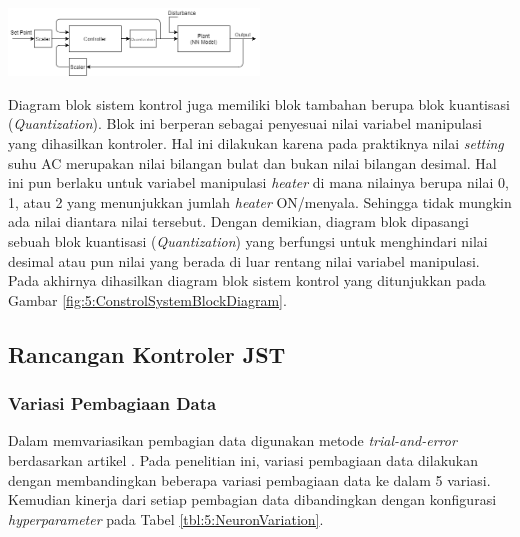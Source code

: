 \documentclass[a4paper,10pt]{article}
\makeatletter
\newenvironment{body}{\begin{multicols}{2}}{\end{multicols}}
\renewenvironment{figure}
{\def\@captype{figure}%
	\captionsetup{labelsep=period,format=hang,font=footnotesize,justification=justified}
}
{}
\makeatother
\begin{document}
\begin{body}
		\begin{figure}
			\centering
			\includegraphics[width=0.5\textwidth]{figures/ControlDesignDiagramII}
			\caption{Diagram blok sistem kontrol berbasis JST}
			\label{fig:5:ConstrolSystemBlockDiagram}
		\end{figure}
		
		Diagram blok sistem kontrol juga memiliki blok tambahan berupa blok kuantisasi (\textit{Quantization}). Blok ini berperan sebagai penyesuai nilai variabel manipulasi yang dihasilkan kontroler. Hal ini dilakukan karena pada praktiknya nilai \textit{setting} suhu AC merupakan nilai bilangan bulat dan bukan nilai bilangan desimal. Hal ini pun berlaku untuk variabel manipulasi \textit{heater} di mana nilainya berupa nilai 0, 1, atau 2 yang menunjukkan jumlah \textit{heater} ON/menyala. Sehingga tidak mungkin ada nilai diantara nilai tersebut. Dengan demikian, diagram blok dipasangi sebuah blok kuantisasi (\textit{Quantization}) yang berfungsi untuk menghindari nilai desimal atau pun nilai yang berada di luar rentang nilai variabel manipulasi. Pada akhirnya dihasilkan diagram blok sistem kontrol yang ditunjukkan pada Gambar \ref{fig:5:ConstrolSystemBlockDiagram}.\\
		
		\subsection{Rancangan Kontroler JST}
		
		\vspace{1mm}
		
		\subsubsection{Variasi Pembagiaan Data}
		
		Dalam memvariasikan pembagian data digunakan metode \textit{trial-and-error} berdasarkan artikel \cite{DataSplitting}. Pada penelitian ini, variasi pembagiaan data dilakukan dengan membandingkan beberapa variasi pembagiaan data ke dalam 5 variasi. Kemudian kinerja dari setiap pembagian data dibandingkan dengan konfigurasi \textit{hyperparameter} pada Tabel \ref{tbl:5:NeuronVariation}.
		

\end{body}
\end{document}
